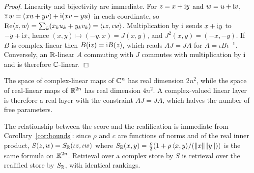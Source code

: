 \begin{proof}
Linearity and bijectivity are immediate. For $z=x+\mathrm{i} y$ and $w=u+\mathrm{i} v$, $\overline z\,w=(xu+yv)+\mathrm{i}(xv-yu)$ in each coordinate, so $\operatorname{Re}\langle z,w\rangle=\sum_k(x_ku_k+y_kv_k)=\langle \iota z,\iota w\rangle$. Multiplication by $\mathrm{i}$ sends $x+\mathrm{i} y$ to $-y+\mathrm{i} x$, hence $(x,y)\mapsto(-y,x)=J(x,y)$, and $J^2(x,y)=(-x,-y)$. If $B$ is complex-linear then $B(\mathrm{i} z)=\mathrm{i} B(z)$, which reads $AJ=JA$ for $A=\iota B\iota^{-1}$. Conversely, an $\mathbb{R}$-linear $A$ commuting with $J$ commutes with multiplication by $\mathrm{i}$ and is therefore $\mathbb{C}$-linear.
\end{proof}

\begin{corollary}\label{cor:dimcount}
The space of complex-linear maps of $\mathbb{C}^n$ has real dimension $2n^2$, while the space of real-linear maps of $\mathbb{R}^{2n}$ has real dimension $4n^2$. A complex-valued linear layer is therefore a real layer with the constraint $AJ=JA$, which halves the number of free parameters.
\end{corollary}

The relationship between the score and the realification is immediate from Corollary~\ref{cor:bounds}: since $\rho$ and $c$ are functions of norms and of the real inner product, $S(z,w)=S_{\mathbb{R}}(\iota z,\iota w)$ where $S_{\mathbb{R}}(x,y)=\frac\rho2(1+\rho\,\langle x,y\rangle/(\lVert x\rVert\lVert y\rVert))$ is the same formula on $\mathbb{R}^{2n}$. Retrieval over a complex store by $S$ is retrieval over the realified store by $S_{\mathbb{R}}$, with identical rankings.

